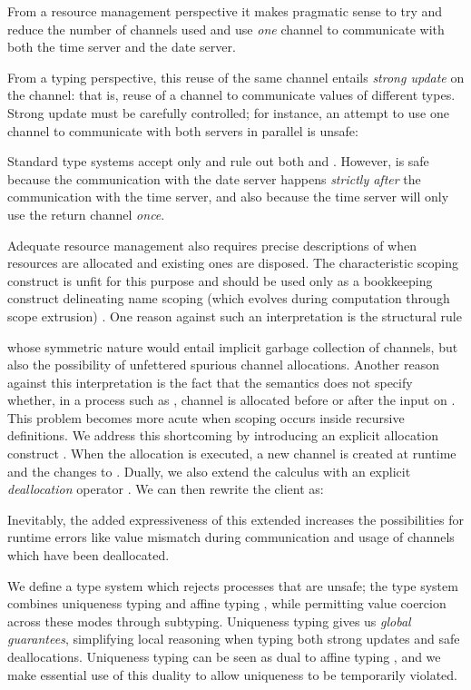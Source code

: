 \documentclass[copyright]{eptcs}
\begin{document}
From a resource management perspective it makes pragmatic sense to try and
reduce the number of channels used and use \emph{one} channel to communicate
with both the time server and the date server. 

From a typing perspective, this reuse of the same channel entails \emph{strong
update} on the channel: that is, reuse of a channel to communicate values of
different types. Strong update must be carefully controlled; for instance, an
attempt to use one channel to communicate with both servers in parallel is
unsafe:

Standard \pic type systems accept only  and rule out both
 and . However,  is
safe because the communication with the date server happens \emph{strictly after}  the
communication with the time server, and also because the time server will only use the
return channel \emph{once}. 

Adequate resource management also requires precise descriptions of when
resources are allocated and existing ones are disposed.  The characteristic
scoping construct  is  unfit for this purpose and should be used
only as a bookkeeping construct delineating name scoping (which evolves during
computation through scope extrusion) . One reason against such an
interpretation  is the structural rule 

whose symmetric nature would entail implicit garbage collection of channels,
but also the possibility of unfettered spurious channel allocations. Another
reason against this interpretation is the fact that the \pic semantics does not
specify whether, in a process such as , channel
 is allocated before or after the input on .
This problem becomes more acute when scoping occurs inside recursive
definitions.  We address this shortcoming by introducing an explicit allocation
construct .  When the allocation is executed,  a new channel 
is created at runtime and the  changes to
.  Dually, we also extend the calculus with an
explicit \emph{deallocation} operator . We can then rewrite the
client as: 

Inevitably, the added expressiveness of this extended \pic increases the
possibilities for runtime errors like value mismatch during communication and
usage of channels which have been deallocated.  

We define a type system which rejects processes that are unsafe; the type
system combines uniqueness typing \cite{barendsen:functional} and affine typing
\cite{KobayashiPT:linearity}, while permitting value coercion across these
modes through subtyping. Uniqueness typing gives us \emph{global guarantees},
simplifying local reasoning when typing both strong updates and safe
deallocations. Uniqueness typing can be seen as dual to affine typing
\cite{harrington:uniquenesslogic}, and we make essential use of this duality to
allow uniqueness to be temporarily violated.
\end{document}

